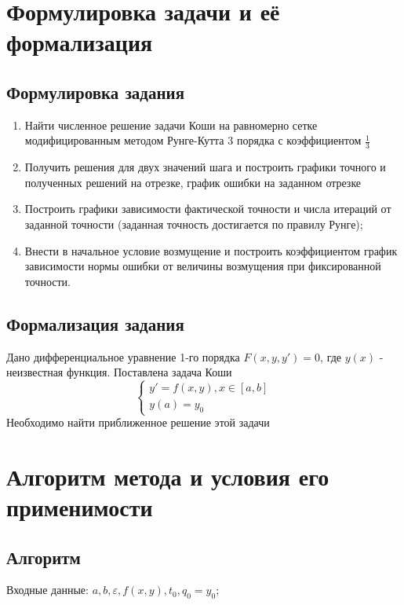 \documentclass{article}
\begin{document}
	\newpage
	
	\section{Формулировка задачи и её формализация}
	\subsection{Формулировка задания}
	\begin{enumerate}
		\item Найти численное решение задачи Коши на равномерно сетке модифицированным методом Рунге-Кутта 3 порядка с коэффициентом $\frac{1}{3}$
		\item Получить решения для двух значений шага и построить
		графики точного и полученных решений на отрезке, график
		ошибки на заданном отрезке
		\item Построить графики зависимости фактической точности и
		числа итераций от заданной точности (заданная точность
		достигается по правилу Рунге);
		\item Внести в начальное условие возмущение и построить коэффициентом график зависимости нормы ошибки от величины возмущения при
		фиксированной точности.

	\end{enumerate}	

	\subsection{Формализация задания}
	Дано дифференциальное уравнение 1-го порядка $F(x, y, y') = 0$,
	где $y(x)$ - неизвестная функция. Поставлена задача Коши
	\begin{equation*}
		\begin{cases}
			y' = f(x,y), x \in [a, b]\\
			y(a) = y_0
		\end{cases}
	\end{equation*}
	Необходимо найти приближенное решение этой задачи
	
	\section{Алгоритм метода и условия его применимости}   
	
	\subsection{Алгоритм}
	Входные данные: $a, b,  \varepsilon, f(x,y), t_0,q_0 = y_0$;  
\end{document}
